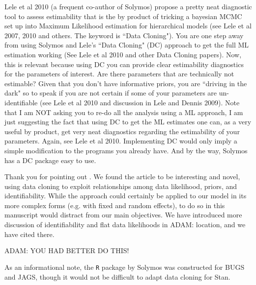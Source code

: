 \documentclass[12pt]{article}
\renewenvironment{quote}  %
              {\list{}{\rightmargin\leftmargin}\normalfont%
               \item\relax}
              {\endlist}
\newcommand{\adam}[1]{{\color{blue} ADAM: #1}}
\begin{document}
Lele et al 2010 (a frequent co-author of Solymos) propose a pretty neat diagnostic tool to assess
estimability that is the by product of tricking a bayesian MCMC set up into Maximum Likelihood estimation for hierarchical models (see Lele et al 2007, 2010 and others. The keyword is ``Data Cloning"). You are one step away from using Solymos and Lele's ``Data Cloning" (DC) approach to get the full ML estimation working (See Lele et al 2010 and other Data Cloning papers). Now, this is relevant because using DC you can provide clear estimability diagnostics for the parameters of interest.  Are there parameters that are technically not estimable?  Given that you don't have informative priors, you are ``driving in the dark" so to speak if you are not certain if some of your parameters are un-identifiable (see Lele et al 2010 and discussion in Lele and Dennis 2009).  Note that I am NOT asking you to re-do all the analysis using a ML approach, I am just suggesting the fact that using DC to get the ML estimates one can, as a very useful by product, get very neat diagnostics regarding
the estimability of your parameters.  Again, see Lele et al 2010.  Implementing DC would only imply a simple modification to the programs you already have. And by the way, Solymos has a DC package easy to use.
\begin{quote}
Thank you for pointing out \citet{Lele2010}.
We found the article to be interesting and novel, using data cloning to exploit relationships among data likelihood, priors, and identifiability.
While the approach could certainly be applied to our model in its more complex forms (e.g. with fixed and random effects), to do so in this manuscript would distract from our main objectives.
We have introduced more discussion of identifiability and flat data likelihoods in \adam{location}, and we have cited \citep{Lele2010} there.

\adam{YOU HAD BETTER DO THIS!}

As an informational note, the \texttt{R} package by Solymos was constructed for BUGS and JAGS, though it would not be difficult to adapt data cloning for Stan.
\end{quote}
\end{document}
